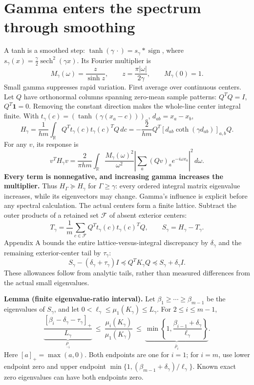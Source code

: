 \documentclass[11pt]{article}
\DeclareMathOperator{\sech}{sech}\DeclareMathOperator{\sign}{sign}
\begin{document}
\section{Gamma enters the spectrum through smoothing}
A tanh is a smoothed step: $\tanh(\gamma\,\cdot)=s_\gamma*\sign$, where
$s_\gamma(x)=\frac\gamma2\sech^2(\gamma x)$. Its Fourier multiplier is
\[
M_\gamma(\omega)=\frac{z}{\sinh z},\qquad
z=\frac{\pi|\omega|}{2\gamma},\qquad M_\gamma(0)=1.
\]
Small gamma suppresses rapid variation. First average over continuous centers.
Let $Q$ have orthonormal columns spanning zero-mean sample patterns:
$Q^TQ=I$, $Q^T\mathbf1=0$. Removing the constant direction makes the
whole-line center integral finite. With
$t_\gamma(c)=(\tanh(\gamma(x_a-c)))_a$, $d_{ab}=x_a-x_b$,
\[
H_\gamma=\frac1{hm}\int_{\mathbb R}Q^Tt_\gamma(c)t_\gamma(c)^TQ\,dc
=-\frac2{hm}Q^T[d_{ab}\coth(\gamma d_{ab})]_{a,b}Q.
\]
For any $v$, its response is
\[
\boxed{v^TH_\gamma v=\frac2{\pi hm}\int_{\mathbb R}
\frac{M_\gamma(\omega)^2}{\omega^2}
\left|\sum_a(Qv)_a e^{-i\omega x_a}\right|^2\,d\omega.}
\]
\textbf{Every term is nonnegative, and increasing gamma increases the multiplier.}
Thus $H_\Gamma\succeq H_\gamma$ for $\Gamma\ge\gamma$: every ordered integral
matrix eigenvalue increases, while its eigenvectors may change. Gamma's
influence is explicit before any spectral calculation.
\clearpage
The actual centers form a finite lattice. Subtract the outer products of a
retained set $\mathcal F$ of absent exterior centers:
\[
T_\gamma=\frac1m\sum_{c\in\mathcal F}Q^Tt_\gamma(c)t_\gamma(c)^TQ,
\qquad S_\gamma=H_\gamma-T_\gamma.
\]
Appendix A bounds the entire lattice-versus-integral discrepancy by
$\delta_\gamma$ and the remaining exterior-center tail by $\tau_\gamma$:
\[
S_\gamma-(\delta_\gamma+\tau_\gamma)I
\preceq Q^TK_\gamma Q\preceq S_\gamma+\delta_\gamma I.
\]
These allowances follow from analytic tails, rather than measured differences
from the actual small eigenvalues.

\textbf{Lemma (finite eigenvalue-ratio interval).}
Let $\beta_1\ge\cdots\ge\beta_{m-1}$ be the eigenvalues of $S_\gamma$,
and let $0<\ell_\gamma\le\mu_1(K_\gamma)\le L_\gamma$.
For $2\le i\le m-1$,
\[
\boxed{\underbrace{\frac{[\beta_i-\delta_\gamma-\tau_\gamma]_+}{L_\gamma}}_{\underline\rho_i}
\ \le\ \frac{\mu_i(K_\gamma)}{\mu_1(K_\gamma)}
\ \le\ \underbrace{\min\!\left\{1,\frac{\beta_{i-1}+\delta_\gamma}{\ell_\gamma}\right\}}_{\overline\rho_i}.}
\]
Here $[a]_+=\max(a,0)$. Both endpoints are one for $i=1$; for $i=m$,
use lower endpoint zero and upper endpoint
$\min\{1,(\beta_{m-1}+\delta_\gamma)/\ell_\gamma\}$. Known exact zero
eigenvalues can have both endpoints zero.
\end{document}
